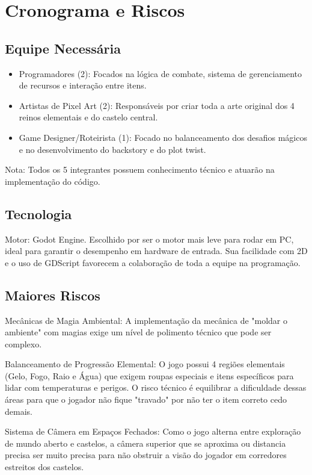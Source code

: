 \documentclass[12pt, a4paper]{article} %
\begin{document}
	\newpage
	
	
	\section{Cronograma e Riscos}
	
	\subsection{Equipe Necessária}
	
	\begin{itemize}
		
		\item Programadores (2): Focados na lógica de combate, sistema de gerenciamento de recursos e interação entre itens.
		
		\item Artistas de Pixel Art (2): Responsáveis por criar toda a arte original dos 4 reinos elementais e do castelo central.
		
		\item Game Designer/Roteirista (1): Focado no balanceamento dos desafios mágicos e no desenvolvimento do backstory e do plot twist.
		
	\end{itemize}
	
	Nota: Todos os 5 integrantes possuem conhecimento técnico e atuarão na implementação do código.
	
	\subsection{Tecnologia}
	
	Motor: Godot Engine.
	Escolhido por ser o motor mais leve para rodar em PC, ideal para garantir o desempenho em hardware de entrada. Sua facilidade com 2D e o uso de GDScript favorecem a colaboração de toda a equipe na programação.
	
	\subsection{Maiores Riscos}
	
	Mecânicas de Magia Ambiental: A implementação da mecânica de "moldar o ambiente" com magias exige um nível de polimento técnico que pode ser complexo.
	
	Balanceamento de Progressão Elemental: O jogo possui 4 regiões elementais (Gelo, Fogo, Raio e Água) que exigem roupas especiais e itens específicos para lidar com temperaturas e perigos. O risco técnico é equilibrar a dificuldade dessas áreas para que o jogador não fique "travado" por não ter o item correto cedo demais.
	
	Sistema de Câmera em Espaços Fechados: Como o jogo alterna entre exploração de mundo aberto e castelos, a câmera superior que se aproxima ou distancia precisa ser muito precisa para não obstruir a visão do jogador em corredores estreitos dos castelos.
	
\end{document}

